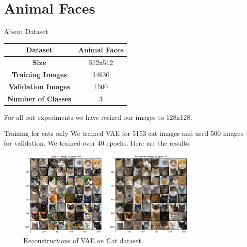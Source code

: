 \section*{Animal Faces}
\begin{frame}{About Dataset}
    \begin{table}
        \centering
        \begin{tabular}{|c|c|}
            \hline
            \textbf{Dataset} & \textbf{Animal Faces} \\
            \hline
            \textbf{Size} & 512x512 \\
            \hline
            \textbf{Training Images} & 14630 \\
            \hline
            \textbf{Validation Images} & 1500 \\
            \hline
            \textbf{Number of Classes} & 3 \\
            \hline
        \end{tabular}   
    \end{table}
    For all out experiments we have resized our images to 128x128.
\end{frame}

\begin{frame}{Training for cats only}
    We trained VAE for 5153 cat images and used 500 images for validation. We trained over 40 epochs. Here are the results:
    \begin{figure}
        \centering
        \includegraphics[width=0.8\textwidth]{../ReportNeurips/catsReconstruct.png}
        \caption{Reconstructions of VAE on Cat dataset}
    \end{figure}
\end{frame}

